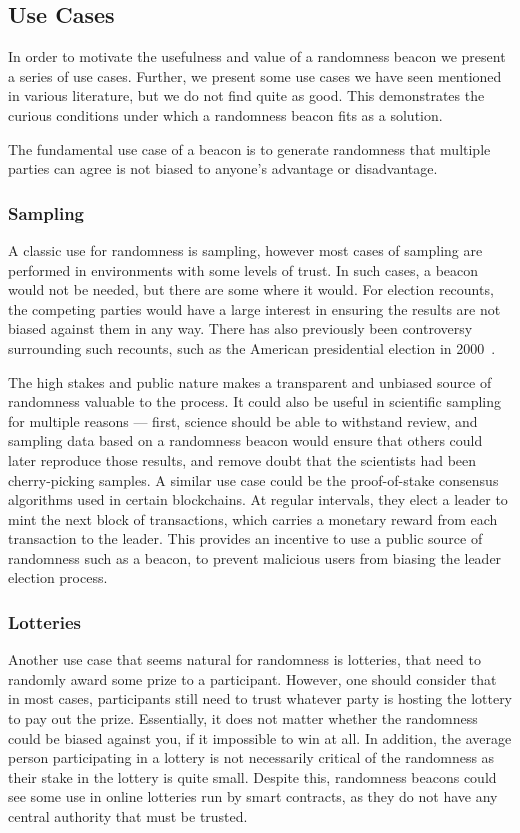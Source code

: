 

\subsection{Use Cases}
In order to motivate the usefulness and value of a randomness beacon we present a series of use cases. Further, we present some use cases we have seen mentioned in various literature, but we do not find quite as good. This demonstrates the curious conditions under which a randomness beacon fits as a solution.

The fundamental use case of a beacon is to generate randomness that multiple parties can agree is not biased to anyone's advantage or disadvantage.

\subsubsection{Sampling}
A classic use for randomness is sampling, however most cases of sampling are performed in environments with some levels of trust.
In such cases, a beacon would not be needed, but there are some where it would.
For election recounts, the competing parties would have a large interest in ensuring the results are not biased against them in any way.
There has also previously been controversy surrounding such recounts, such as the American presidential election in 2000~\cite{bushgore}.

The high stakes and public nature makes a transparent and unbiased source of randomness valuable to the process.
It could also be useful in scientific sampling for multiple reasons --- first, science should be able to withstand review, and sampling data based on a randomness beacon would ensure that others could later reproduce those results, and remove doubt that the scientists had been cherry-picking samples.
A similar use case could be the proof-of-stake consensus algorithms used in certain blockchains.
At regular intervals, they elect a leader to mint the next block of transactions, which carries a monetary reward from each transaction to the leader.
This provides an incentive to use a public source of randomness such as a beacon, to prevent malicious users from biasing the leader election process.

\subsubsection{Lotteries}
Another use case that seems natural for randomness is lotteries, that need to randomly award some prize to a participant. However, one should consider that in most cases, participants still need to trust whatever party is hosting the lottery to pay out the prize. Essentially, it does not matter whether the randomness could be biased against you, if it impossible to win at all.
In addition, the average person participating in a lottery is not necessarily critical of the randomness as their stake in the lottery is quite small.
Despite this, randomness beacons could see some use in online lotteries run by smart contracts, as they do not have any central authority that must be trusted.

